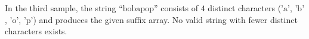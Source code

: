 In the third sample, the string $\text{``bobapop''}$ consists of $4$ distinct characters ($\text{'a'}$, $\text{'b'}$, $\text{'o'}$, $\text{'p'}$) and produces the given suffix array. 
No valid string with fewer distinct characters exists.
